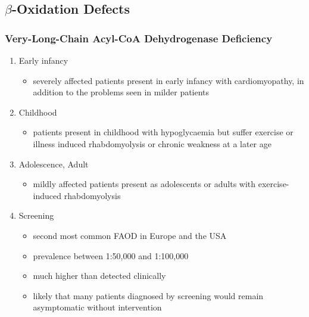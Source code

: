 \documentclass{scrartcl}
\begin{document}
\subsection{\(\beta\)-Oxidation Defects}
\label{sec:org8a72c1c}
\subsubsection{Very-Long-Chain Acyl-CoA Dehydrogenase Deficiency}
\label{sec:org5853501}
\begin{enumerate}
\item Early infancy
\label{sec:org451fe02}
\begin{itemize}
\item severely affected patients present in early infancy with
cardiomyopathy, in addition to the problems seen in milder patients
\end{itemize}

\item Childhood
\label{sec:orgd93902b}
\begin{itemize}
\item patients present in childhood with hypoglycaemia but suffer exercise
or illness induced rhabdomyolysis or chronic weakness at a later age
\end{itemize}

\item Adolescence, Adult
\label{sec:orgfad23db}
\begin{itemize}
\item mildly affected patients present as adolescents or adults with
exercise-induced rhabdomyolysis
\end{itemize}

\item Screening
\label{sec:org357681a}
\begin{itemize}
\item second most common FAOD in Europe and the USA
\item prevalence between 1:50,000 and 1:100,000
\item much higher than detected clinically
\item likely that many patients diagnosed by screening would remain
asymptomatic without intervention
\end{itemize}
\end{enumerate}
\end{document}
